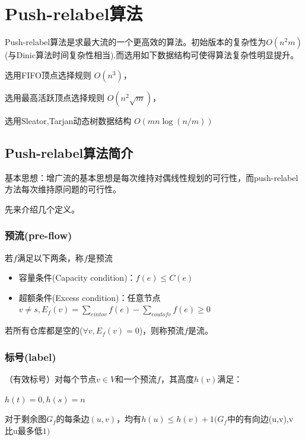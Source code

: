 \section{Push-relabel算法}
Push-relabel算法是求最大流的一个更高效的算法。初始版本的复杂性为$O(n^2m)$(与Dinic算法时间复杂性相当).而选用如下数据结构可使得算法复杂性明显提升。
\begin{itemize}
  \begin{small}
  \item  选用FIFO顶点选择规则 \qquad\qquad $O(n^3)$，
  \item  选用最高活跃顶点选择规则 \qquad\quad $O(n^2\sqrt{m})$，
  \item  选用Sleator,Tarjan动态树数据结构 \qquad $O(mn\log (n/m))$
\end{small}
\end{itemize}
\subsection{Push-relabel算法简介}
基本思想：增广流的基本思想是每次维持对偶线性规划的可行性，而push-relabel方法每次维持原问题的可行性。

先来介绍几个定义。

\subsubsection{预流(pre-flow)}
\begin{definition}
若$f$满足以下两条，称$f$是预流
\begin{itemize}
  \item 容量条件(Capacity condition)：$f(e)\leq C(e)$
  \item 超额条件(Excess condition)：任意节点$v\neq s, E_f(v)=\sum_{e into v}f(e)-\sum_{e out of v}f(e)\geq 0$
\end{itemize}

 若所有仓库都是空的($\forall v, E_f(v)=0$)，则称预流$f$是流。

\end{definition}
\subsubsection{标号(label)}
  \begin{definition}（有效标号）对每个节点$v\in V$和一个预流$f$，其高度$h(v)$满足：
\begin{itemize}
  \begin{small}
    \item $h(t)=0, h(s)=n$
    \item 对于剩余图$G_f$的每条边$(u,v)$，均有$h(u)\leq h(v)+1$$(G_f$中的有向边(u,v),v 比u最多低$1)$
\end{small}
\end{itemize}
  \end{definition}

